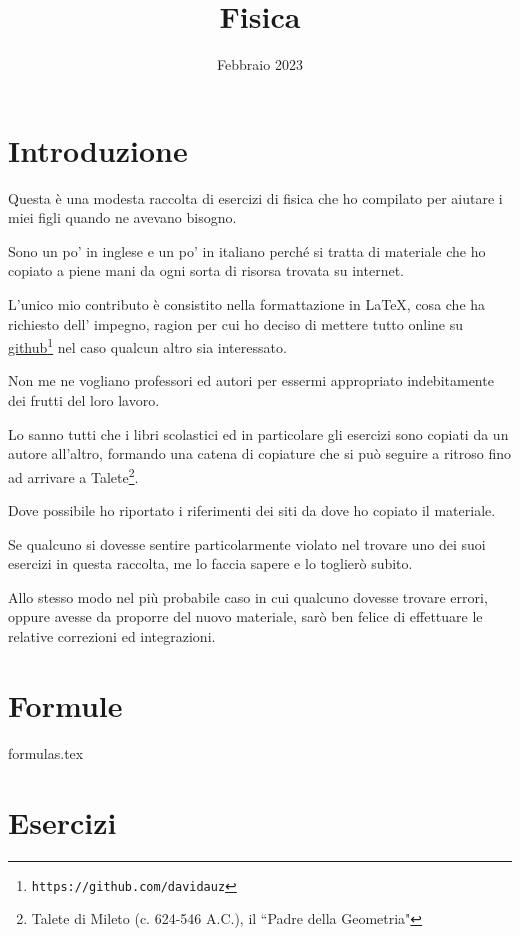 \documentclass[a4paper,14pt]{extarticle}
\title{Fisica}
\author{}
\date{Febbraio 2023}
\begin{document}
\maketitle
\tableofcontents
\newpage

\section{Introduzione}

Questa è una modesta raccolta di esercizi di fisica che ho compilato per aiutare i
miei figli quando ne avevano bisogno.

Sono un po' in inglese e un po' in italiano perché
si tratta di materiale che ho copiato a piene mani da ogni sorta di risorsa trovata su internet.

L'unico mio contributo è consistito nella formattazione in  \LaTeX, cosa che ha richiesto 
dell' impegno, ragion per cui ho deciso di mettere tutto online su \href{https://github.com/davidauz}{github}\footnote{\texttt{https://github.com/davidauz}}
nel caso qualcun altro sia interessato.

Non me ne vogliano professori ed autori per essermi appropriato indebitamente dei frutti del loro lavoro.

Lo sanno tutti che i libri scolastici ed in particolare gli esercizi sono copiati da un autore all'altro,
formando una catena di copiature che si può seguire a ritroso fino ad arrivare a 
Talete\footnote{Talete di Mileto (c. 624-546 A.C.), il ``Padre della Geometria"}.

Dove possibile ho riportato i riferimenti dei siti da dove ho copiato il materiale.

Se qualcuno si dovesse sentire particolarmente violato nel trovare uno dei suoi esercizi in 
questa raccolta, me lo faccia sapere e lo toglierò subito.

Allo stesso modo nel più probabile caso in cui qualcuno dovesse trovare errori, oppure avesse da proporre del 
nuovo materiale, sarò ben felice di effettuare le relative correzioni ed integrazioni.



\section{Formule}

 {formulas.tex}

\section{Esercizi}










\end{document}
